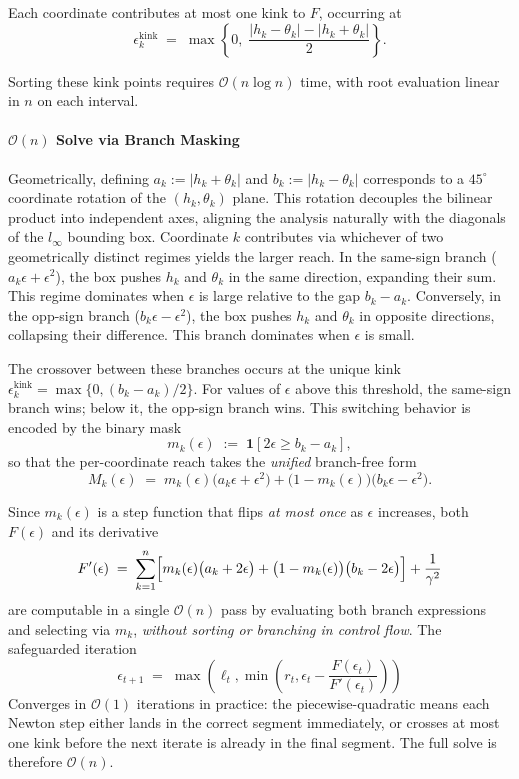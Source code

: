 \documentclass{article}
\begin{document}
Each coordinate contributes at most one kink to $F$, occurring at
\[
  \epsilon_k^{\mathrm{kink}}
    \;=\; \max\!\left\{0,\;
      \frac{|h_k-\theta_{k}|-|h_k+\theta_{k}|}{2}
    \right\}.
\]

Sorting these kink points requires $\mathcal{O}(n\log n)$ time, with root
evaluation linear in $n$ on each interval.
\paragraph{$\mathcal{O}(n)$ Solve via Branch Masking}
Geometrically, defining $a_k := |h_k+\theta_k|$ and $b_k := |h_k-\theta_k|$ corresponds to a $45^{\circ}$ coordinate rotation of the $(h_k, \theta_k)$ plane. This rotation decouples the bilinear product into independent axes, aligning the analysis naturally with the diagonals of the $l_\infty$ bounding box. Coordinate $k$ contributes via whichever of two geometrically distinct regimes yields the larger reach. In the same-sign branch ($a_k\epsilon + \epsilon^2$), the box pushes $h_k$ and $\theta_k$ in the same direction, expanding their sum. This regime dominates when $\epsilon$ is large relative to the gap $b_k - a_k$. Conversely, in the opp-sign branch ($b_k\epsilon - \epsilon^2$), the box pushes $h_k$ and $\theta_k$ in opposite directions, collapsing their difference. This branch dominates when $\epsilon$ is small.

The crossover between these branches occurs at the unique kink $\epsilon_k^{\mathrm{kink}} = \max\{0, (b_k - a_k)/2\}$. For values of $\epsilon$ above this threshold, the same-sign branch wins; below it, the opp-sign branch wins. This switching behavior is encoded by the binary mask
\[
  m_k(\epsilon) \;:=\; \mathbf{1}\!\left[2\epsilon \geq b_k - a_k\right],
\]
so that the per-coordinate reach takes the \emph{unified} branch-free form
\begin{equation}
  M_k(\epsilon)
    \;=\; m_k(\epsilon)\bigl(a_k\epsilon+\epsilon^2\bigr)
      + \bigl(1-m_k(\epsilon)\bigr)\bigl(b_k\epsilon-\epsilon^2\bigr).
\end{equation}

Since $m_k(\epsilon)$ is a step function that flips \emph{at most once} as
$\epsilon$ increases, both $F(\epsilon)$ and its derivative
\begin{equation}
  F'(\epsilon)
    \;=\; \sum_{k=1}^{n}\Bigl[
        m_k(\epsilon)\bigl(a_k + 2\epsilon\bigr)
      + \bigl(1-m_k(\epsilon)\bigr)\bigl(b_k - 2\epsilon\bigr)
    \Bigr] + \frac{1}{\gamma^2}
\end{equation}
are computable in a single $\mathcal{O}(n)$ pass by evaluating both branch
expressions and selecting via $m_k$, \emph{without sorting or branching in
control flow}. The safeguarded
iteration
\[
  \epsilon_{t+1}
    \;=\; \max\!\left(\ell_t,\min\!\left(r_t, \epsilon_t - \frac{F(\epsilon_t)}{F'(\epsilon_t)}\right)\right)
\]
Converges in $\mathcal{O}(1)$ iterations in practice: the piecewise-quadratic means each Newton step either lands in the correct segment immediately, or crosses at most one kink before the next iterate is already in the final segment. The full solve is therefore $\mathcal{O}(n)$.



\end{document}
